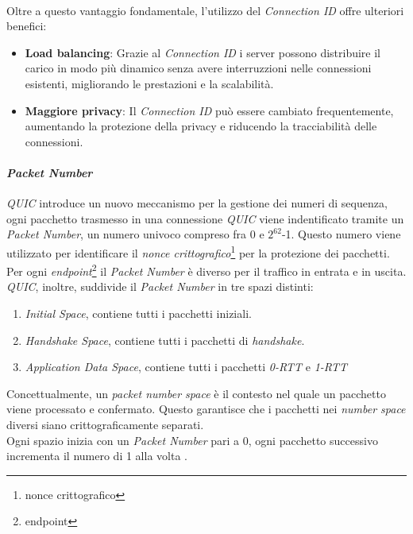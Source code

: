 \\
Oltre a questo vantaggio fondamentale, l'utilizzo del \emph{Connection ID} offre ulteriori benefici:
\begin{itemize}
\item \textbf{Load balancing}: Grazie al \emph{Connection ID} i server possono distribuire il carico in modo più dinamico senza avere interruzzioni nelle connessioni esistenti, migliorando le prestazioni e la scalabilità.
\item \textbf{Maggiore privacy}: Il \emph{Connection ID} può essere cambiato frequentemente, aumentando la protezione della privacy e riducendo la tracciabilità delle connessioni.
\end{itemize}
\paragraph{\textit{Packet Number}}

\noindent \emph{QUIC} introduce un nuovo meccanismo per la gestione dei numeri di sequenza, ogni pacchetto trasmesso in una connessione \emph{QUIC} viene indentificato tramite un \emph{Packet Number}, un numero univoco 
compreso fra 0 e $2^{62}$-1. Questo numero viene utilizzato per identificare il \emph{nonce crittografico}\footnote{\gls{nonce crittografico}} per la protezione dei pacchetti. Per ogni \emph{endpoint}\footnote{\gls{endpoint}} il \emph{Packet Number} è diverso per il traffico in entrata e in uscita.
\emph{QUIC}, inoltre, suddivide il \emph{Packet Number} in tre spazi distinti:
\begin{enumerate}[label=\roman*]
    \item \emph{Initial Space}, contiene tutti i pacchetti iniziali.
    \item \emph{Handshake Space}, contiene tutti i pacchetti di \emph{handshake}.
    \item \emph{Application Data Space}, contiene tutti i pacchetti \emph{0-RTT} e \emph{1-RTT}
\end{enumerate}
\noindent Concettualmente, un \emph{packet number space} è il contesto nel quale un pacchetto viene processato e confermato. Questo garantisce che i pacchetti nei \emph{number space} diversi siano crittograficamente separati.
\\
Ogni spazio inizia con un \emph{Packet Number} pari a 0, ogni pacchetto successivo incrementa il numero di 1 alla volta \cite{site:Packet-number}. 


